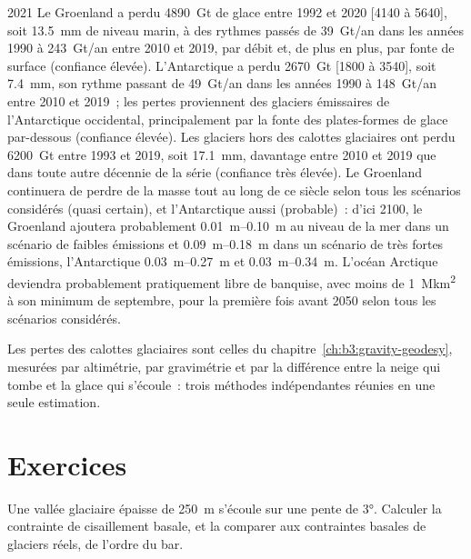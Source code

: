 \begin{dated}{2021}
Le Groenland a perdu \qty{4890}{Gt} de glace entre 1992 et 2020 [4140 à 5640],
soit \qty{13.5}{mm} de niveau marin, à des rythmes passés de \qty{39}{Gt/an} dans les
années 1990 à \qty{243}{Gt/an} entre 2010 et 2019, par débit et, de plus en plus,
par fonte de surface (confiance élevée). L'Antarctique a perdu \qty{2670}{Gt}
[1800 à 3540], soit \qty{7.4}{mm}, son rythme passant de \qty{49}{Gt/an} dans les années
1990 à \qty{148}{Gt/an} entre 2010 et 2019~; les pertes proviennent des glaciers émissaires de
l'Antarctique occidental, principalement par la fonte des plates-formes de glace par-dessous (confiance
élevée). Les glaciers hors des calottes glaciaires ont perdu \qty{6200}{Gt} entre
1993 et 2019, soit \qty{17.1}{mm}, davantage entre 2010 et 2019 que dans toute autre décennie
de la série (confiance très élevée). Le Groenland continuera de perdre de la masse
tout au long de ce siècle selon tous les scénarios considérés (quasi
certain), et l'Antarctique aussi (probable)~: d'ici 2100, le Groenland ajoutera
probablement \qtyrange{0.01}{0.10}{m} au niveau de la mer dans un scénario de faibles
émissions et \qtyrange{0.09}{0.18}{m} dans un scénario de très fortes émissions,
l'Antarctique \qtyrange{0.03}{0.27}{m} et \qtyrange{0.03}{0.34}{m}. L'océan Arctique
deviendra probablement pratiquement libre de banquise, avec moins de
\qty{1}{\mega km^2} à son minimum de septembre, pour la première fois avant 2050 selon
tous les scénarios considérés.
\end{dated}

Les pertes des calottes glaciaires sont celles du chapitre~\ref{ch:b3:gravity-geodesy},
mesurées par altimétrie, par gravimétrie et par la différence entre la neige
qui tombe et la glace qui s'écoule~: trois méthodes indépendantes
réunies en une seule estimation.

\section{Exercices}

\begin{exercise}[$\star$]\label{exo:b3:glaciology:1}
Une vallée glaciaire épaisse de \qty{250}{m} s'écoule sur une pente de \ang{3}. Calculer
la contrainte de cisaillement basale, et la comparer aux contraintes basales de
glaciers réels, de l'ordre du bar.
\end{exercise}

